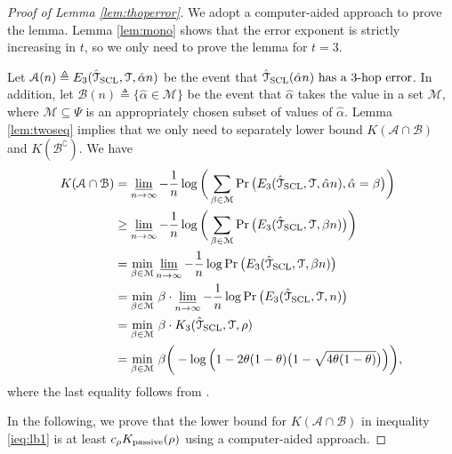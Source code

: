 \documentclass[11pt,onecolumn]{article}
\newcommand{\calA}{\mathcal{A}}
\newcommand{\calB}{\mathcal{B}}
\newcommand{\calM}{\mathcal{M}}
\newcommand{\calT}{\mathcal{T}}
\newcommand{\hatcalT}{\hat{\calT}}
\newcommand{\halpha}{\hat{\alpha}}
\newcommand{\Passive}{{\rm passive}}
\begin{document}
\begin{proof}[Proof of Lemma \ref{lem:thoperror}]
	We adopt a computer-aided approach to prove the lemma. Lemma \ref{lem:mono} shows that the error exponent is strictly increasing in $t$, so we only need to prove the lemma for $t=3$. 
	
	Let $\calA(n)\triangleq E_{3}(\hatcalT_{{\rm SCL}},\calT,\halpha n)$ be the event that $\hatcalT_{\rm{SCL}}(\halpha n)\text{ has a }3\text{-hop error}$. In addition,   let $\calB(n)\triangleq\{\halpha \in \calM\}$ be the event that 
	$\halpha$ takes the value in a set $\calM$, where $\calM\subseteq \Psi$ is an appropriately chosen subset of values of $\halpha$. Lemma \ref{lem:twoseq} implies that we only need to separately lower bound $K(\calA\cap \calB)$ and $K (\calB^{\complement})$. We have
	\begin{align}
		K ( \calA\cap \calB)&=\varliminf_{n\rightarrow\infty}-\frac{1}{n}\log \bigg(\sum_{\beta\in \calM}\Pr\big(E_{3}(\hatcalT_{{\rm SCL}},\calT,\halpha n),\halpha=\beta\big)\bigg)\\
		&\geq \varliminf_{n\rightarrow\infty}-\frac{1}{n}\log \bigg(\sum_{\beta\in \calM}\Pr\big(E_{3}(\hatcalT_{{\rm SCL}},\calT,\beta n)\big)\bigg)\\
		&=\min_{\beta\in \calM}\varliminf_{n\rightarrow\infty}-\frac{1}{n}\log\Pr\big(E_{3}(\hatcalT_{{\rm SCL}},\calT,\beta n)\big)\\
		&=\min_{\beta\in \calM}\,\beta\cdot \varliminf_{n\rightarrow\infty}-\frac{1}{n}\log\Pr\big(E_{3}(\hatcalT_{{\rm SCL}},\calT,n)\big)\\
		&=\min_{\beta\in \calM}\,\beta \cdot K _{3}(\hatcalT_{{\rm SCL}},\calT,\rho)\\
		&=\min_{\beta\in \calM}\,\beta \bigg(-\log\Big(1-2\theta(1-\theta)\big(1-\sqrt{4\theta(1-\theta)}\big)\Big)\bigg), \label{ieq:lb1}
	\end{align}
	where the last equality follows from \cite[Lemma 1]{tandon2020exact}.

	In the following, we prove that the lower bound for $K ( \calA\cap \calB)$ in inequality \eqref{ieq:lb1} is at least $c_{\rho}K _{\Passive}(\rho)$ using a computer-aided approach.


\end{proof}
\end{document}
